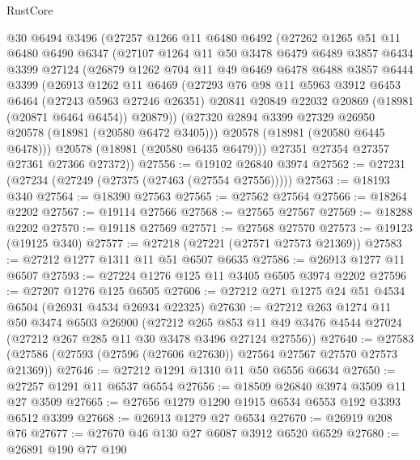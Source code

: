 \begin{lexlean}{RustCore}
\begin{coremodule}
    @30
    @6494
    @3496
    (@27257
      @1266
      @11
      @6480
      @6492
      (@27262
        @1265
        @51
        @11
        @6480
        @6490
        @6347
        (@27107
          @1264
          @11
          @50
          @3478
          @6479
          @6489
          @3857
          @6434
          @3399
          @27124
          (@26879
            @1262
            @704
            @11
            @49
            @6469
            @6478
            @6488
            @3857
            @6444
            @3399
            (@26913
              @1262
              @11
              @6469
              (@27293
                @76
                @98
                @11
                @5963
                @3912
                @6453
                @6464
                (@27243 @5963 @27246 @26351)
                @20841
                @20849
                @22032
                @20869
                (@18981 (@20871 @6464 @6454))
                @20879))
            (@27320 @2894 @3399 @27329 @26950 @20578 (@18981 (@20580 @6472 @3405)))
            @20578
            (@18981 (@20580 @6445 @6478)))
          @20578
          (@18981 (@20580 @6435 @6479)))
        @27351
        @27354
        @27357
        @27361
        @27366
        @27372))
@27556 := @19102 @26840 @3974
@27562 := @27231 (@27234 (@27249 (@27375 (@27463 (@27554 @27556)))))
@27563 := @18193 @340
@27564 := @18390 @27563
@27565 := @27562 @27564
@27566 := @18264 @2202
@27567 := @19114 @27566
@27568 := @27565 @27567
@27569 := @18288 @2202
@27570 := @19118 @27569
@27571 := @27568 @27570
@27573 := @19123 (@19125 @340)
@27577 := @27218 (@27221 (@27571 @27573 @21369))
@27583 := @27212 @1277 @1311 @11 @51 @6507 @6635
@27586 := @26913 @1277 @11 @6507
@27593 := @27224 @1276 @125 @11 @3405 @6505 @3974 @2202
@27596 := @27207 @1276 @125 @6505
@27606 := @27212 @271 @1275 @24 @51 @4534 @6504 (@26931 @4534 @26934 @22325)
@27630 := @27212
    @263
    @1274
    @11
    @50
    @3474
    @6503
    @26900
    (@27212
      @265
      @853
      @11
      @49
      @3476
      @4544
      @27024
      (@27212 @267 @285 @11 @30 @3478 @3496 @27124 @27556))
@27640 := @27583 (@27586 (@27593 (@27596 (@27606 @27630)) @27564 @27567 @27570 @27573 @21369))
@27646 := @27212 @1291 @1310 @11 @50 @6556 @6634
@27650 := @27257 @1291 @11 @6537 @6554
@27656 := @18509 @26840 @3974 @3509 @11 @27 @3509
@27665 := @27656 @1279 @1290 @1915 @6534 @6553 @192 @3393 @6512 @3399
@27668 := @26913 @1279 @27 @6534
@27670 := @26919 @208 @76
@27677 := @27670 @46 @130 @27 @6087 @3912 @6520 @6529
@27680 := @26891 @190 @77 @190

\end{coremodule}
\end{lexlean}
